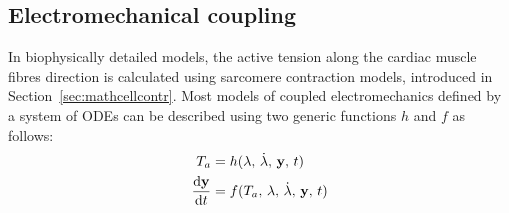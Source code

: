 






%
%
%
\subsection{Electromechanical coupling}\label{sec:mathelecmechcoupl}
In biophysically detailed models, the active tension along the cardiac muscle fibres direction is calculated using sarcomere contraction models, introduced in Section~\ref{sec:mathcellcontr}. Most models of coupled electromechanics defined by a system of ODEs can be described using two generic functions $h$ and $f$ as follows:
%
\begin{align}
    T_a &= h(\lambda,\,\dot{\lambda},\,\mathbf{y},\,t) \label{eq:eq5} \\
    \dfrac{\mathrm{d}{\mathbf{y}}}{\mathrm{d}{t}} &= f(T_a,\,\lambda,\,\dot{\lambda},\,\mathbf{y},\,t) \label{eq:eq6}
\end{align}

